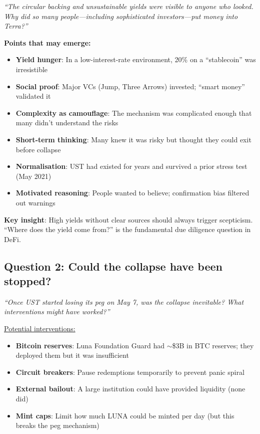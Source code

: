 \documentclass[11pt]{article}
\begin{document}
\textit{``The circular backing and unsustainable yields were visible to anyone who looked. Why did so many people---including sophisticated investors---put money into Terra?''}

\medskip
\noindent\textbf{Points that may emerge:}

\begin{itemize}[leftmargin=*]
\item \textbf{Yield hunger}: In a low-interest-rate environment, 20\% on a ``stablecoin'' was irresistible
\item \textbf{Social proof}: Major VCs (Jump, Three Arrows) invested; ``smart money'' validated it
\item \textbf{Complexity as camouflage}: The mechanism was complicated enough that many didn't understand the risks
\item \textbf{Short-term thinking}: Many knew it was risky but thought they could exit before collapse
\item \textbf{Normalisation}: UST had existed for years and survived a prior stress test (May 2021)
\item \textbf{Motivated reasoning}: People wanted to believe; confirmation bias filtered out warnings
\end{itemize}

\medskip
\noindent\textbf{Key insight}: High yields without clear sources should always trigger scepticism. ``Where does the yield come from?'' is the fundamental due diligence question in DeFi.

\subsection*{Question 2: Could the collapse have been stopped?}

\textit{``Once UST started losing its peg on May 7, was the collapse inevitable? What interventions might have worked?''}

\medskip
\noindent\underline{Potential interventions:}
\begin{itemize}[leftmargin=*]
\item \textbf{Bitcoin reserves}: Luna Foundation Guard had $\sim$\$3B in BTC reserves; they deployed them but it was insufficient
\item \textbf{Circuit breakers}: Pause redemptions temporarily to prevent panic spiral
\item \textbf{External bailout}: A large institution could have provided liquidity (none did)
\item \textbf{Mint caps}: Limit how much LUNA could be minted per day (but this breaks the peg mechanism)
\end{itemize}
\end{document}
